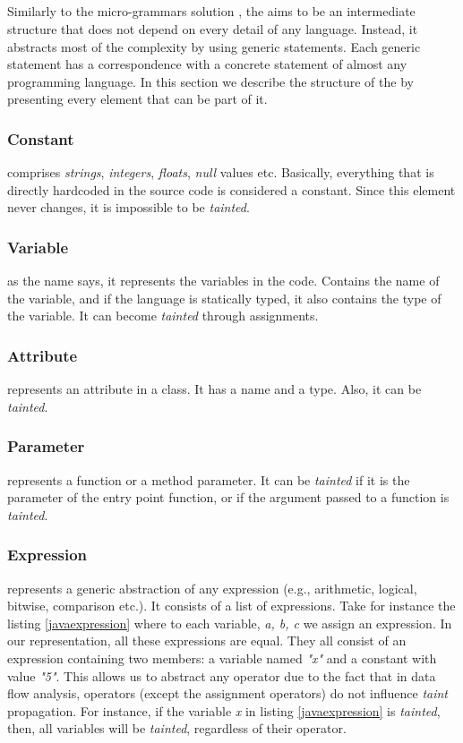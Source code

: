 \subsection{\astname{}}
\label{genericast}
Similarly to the micro-grammars solution \cite{microgrammars}, the \astname{} aims to be an intermediate structure that does not depend on every detail of any language. Instead, it abstracts most of the complexity by using generic statements. Each generic statement has a correspondence with a concrete statement of almost any programming language. In this section we describe the structure of the \astname{} by presenting every element that can be part of it. 

\subsubsection{Constant} comprises \textit{strings}, \textit{integers}, \textit{floats}, \textit{null} values etc. Basically, everything that is directly hardcoded in the source code is considered a constant. Since this element never changes, it is impossible to be \textit{tainted}.
 
\subsubsection{Variable} as the name says, it represents the variables in the code. Contains the name of the variable, and if the language is statically typed, it also contains the type of the variable. It can become \textit{tainted} through assignments.

\subsubsection{Attribute} represents an attribute in a class. It has a name and a type. Also, it can be \textit{tainted}.

\subsubsection{Parameter} represents a function or a method parameter. It can be \textit{tainted} if it is the parameter of the entry point function, or if the argument passed to a function is \textit{tainted}.

\subsubsection{Expression} represents a generic abstraction of any expression (e.g., arithmetic, logical, bitwise, comparison etc.). It consists of a list of expressions.
Take for instance the listing \ref{javaexpression} where to each variable, \textit{a, b, c} we assign an expression. In our representation, all these expressions are equal. They all consist of an expression containing two members: a variable named \textit{"x"} and a constant with value \textit{"5"}. This allows us to abstract any operator due to the fact that in data flow analysis, operators (except the assignment operators) do not influence \textit{taint} propagation. For instance, if the variable \textit{x} in listing \ref{javaexpression} is \textit{tainted}, then, all variables will be \textit{tainted}, regardless of their operator.


